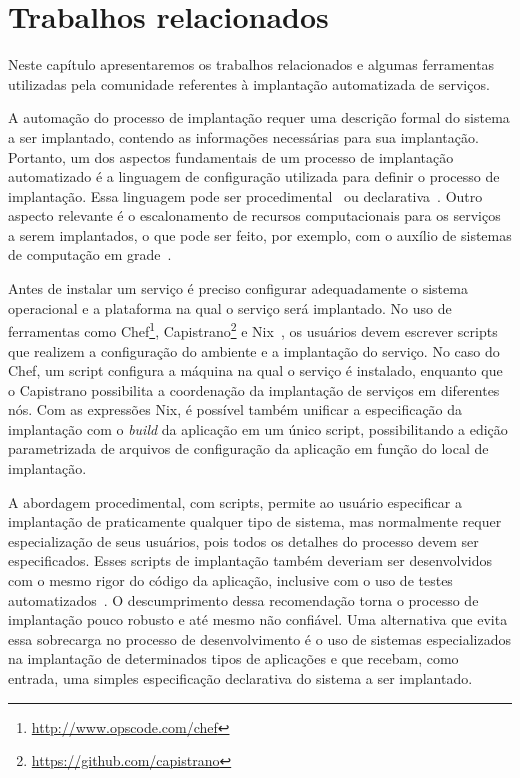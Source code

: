 
\chapter{Trabalhos relacionados}
\label{cap:relacionados}

Neste capítulo apresentaremos os trabalhos relacionados e algumas ferramentas utilizadas pela comunidade referentes à implantação automatizada de serviços. 

A automação do processo de implantação requer uma descrição formal do sistema a ser implantado, contendo as informações necessárias para sua implantação. Portanto, um dos aspectos fundamentais de um processo de implantação automatizado é a linguagem de configuração utilizada para definir o processo de implantação. Essa linguagem pode ser procedimental~\cite{Dolstra2005Configuration} ou declarativa~\cite{Magee1996Dynamic, Balter1998Olan}. Outro aspecto relevante é o escalonamento de recursos computacionais para os serviços a serem implantados, o que pode ser feito, por exemplo, com o auxílio de sistemas de computação em grade~\cite{Watson2006Dynasoar}.

Antes de instalar um serviço é preciso configurar adequadamente o sistema operacional e a plataforma na qual o serviço será implantado. No uso de ferramentas como Chef\footnote{\url{http://www.opscode.com/chef}}, Capistrano\footnote{\url{https://github.com/capistrano}} e Nix~\cite{Dolstra2005Configuration}, os usuários devem escrever scripts que realizem a configuração do ambiente e a implantação do serviço. No caso do Chef, um script configura a máquina na qual o serviço é instalado, enquanto que o Capistrano possibilita a coordenação da implantação de serviços em diferentes nós. Com as expressões Nix, é possível também unificar a especificação da implantação com o \textit{build} da aplicação em um único script, possibilitando a edição parametrizada de arquivos de configuração da aplicação em função do local de implantação. 

A abordagem procedimental, com scripts, permite ao usuário especificar a implantação de praticamente qualquer tipo de sistema, mas normalmente requer especialização de seus usuários, pois todos os detalhes do processo devem ser especificados. Esses scripts de implantação também deveriam ser desenvolvidos com o mesmo rigor do código da aplicação, inclusive com o uso de testes automatizados~\cite{Humble2011Continuous}. O descumprimento dessa recomendação torna o processo de implantação pouco robusto e até mesmo não confiável. Uma alternativa que evita essa sobrecarga no processo de desenvolvimento é o uso de sistemas especializados na implantação de determinados tipos de aplicações e que recebam, como entrada, uma simples especificação declarativa do sistema a ser implantado.

